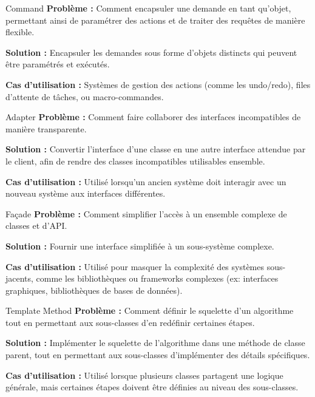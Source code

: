 \documentclass[aspectratio=169]{beamer}
\begin{document}
\begin{frame}{Command}
    \textbf{Problème :} 
    Comment encapsuler une demande en tant qu'objet, permettant ainsi de paramétrer des actions et de traiter des requêtes de manière flexible.

    \textbf{Solution :} 
    Encapsuler les demandes sous forme d'objets distincts qui peuvent être paramétrés et exécutés.

    \textbf{Cas d'utilisation :}
    Systèmes de gestion des actions (comme les undo/redo), files d'attente de tâches, ou macro-commandes.
\end{frame}

\begin{frame}{Adapter}
    \textbf{Problème :} 
    Comment faire collaborer des interfaces incompatibles de manière transparente.

    \textbf{Solution :} 
    Convertir l'interface d'une classe en une autre interface attendue par le client, afin de rendre des classes incompatibles utilisables ensemble.

    \textbf{Cas d'utilisation :}
    Utilisé lorsqu'un ancien système doit interagir avec un nouveau système aux interfaces différentes.
\end{frame}

\begin{frame}{Façade}
    \textbf{Problème :} 
    Comment simplifier l'accès à un ensemble complexe de classes et d'API.

    \textbf{Solution :} 
    Fournir une interface simplifiée à un sous-système complexe.

    \textbf{Cas d'utilisation :}
    Utilisé pour masquer la complexité des systèmes sous-jacents, comme les bibliothèques ou frameworks complexes (ex: interfaces graphiques, bibliothèques de bases de données).
\end{frame}

\begin{frame}{Template Method}
    \textbf{Problème :} 
    Comment définir le squelette d'un algorithme tout en permettant aux sous-classes d'en redéfinir certaines étapes.

    \textbf{Solution :} 
    Implémenter le squelette de l'algorithme dans une méthode de classe parent, tout en permettant aux sous-classes d'implémenter des détails spécifiques.

    \textbf{Cas d'utilisation :}
    Utilisé lorsque plusieurs classes partagent une logique générale, mais certaines étapes doivent être définies au niveau des sous-classes.
\end{frame}
\end{document}

